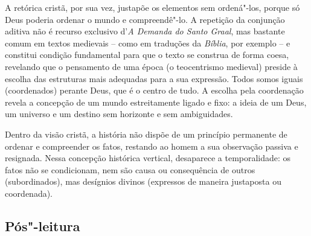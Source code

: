 \documentclass[11pt]{extarticle}
\begin{document}
A retórica cristã, por sua vez, justapõe os
elementos sem ordená"-los, porque só Deus poderia ordenar o mundo e
compreendê"-lo. A repetição da conjunção aditiva não é recurso exclusivo
d'\emph{A Demanda do Santo Graal}, mas bastante comum em textos
medievais -- como em traduções da \emph{Bíblia}, por exemplo -- e
constitui condição fundamental para que o texto se construa de forma
coesa, revelando que o pensamento de uma época (o teocentrismo medieval)
preside à escolha das estruturas mais adequadas para a sua expressão.
Todos somos iguais (coordenados) perante Deus, que é o centro de tudo. A
escolha pela coordenação revela a concepção de um mundo estreitamente
ligado e fixo: a ideia de um Deus, um universo e um destino sem
horizonte e sem ambiguidades.

Dentro da visão cristã, a história não dispõe de um princípio permanente
de ordenar e compreender os fatos, restando ao homem a sua observação
passiva e resignada. Nessa concepção histórica vertical, desaparece a
temporalidade: os fatos não se condicionam, nem são causa ou
consequência de outros (subordinados), mas desígnios divinos (expressos
de maneira justaposta ou coordenada).


\subsection{Pós"-leitura}


\end{document}
